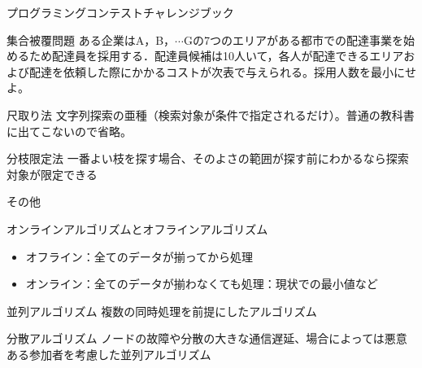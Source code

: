 \documentclass{beamer}
\begin{document}
\begin{frame}[fragile]{プログラミングコンテストチャレンジブック}{}
\begin{block}{集合被覆問題}
ある企業はA，B，$\cdots$Gの7つのエリアがある都市での配達事業を始めるため配達員を採用する．配達員候補は10人いて，各人が配達できるエリアおよび配達を依頼した際にかかるコストが次表で与えられる。採用人数を最小にせよ。
\end{block}

\begin{block}{尺取り法}
文字列探索の亜種（検索対象が条件で指定されるだけ）。普通の教科書に出てこないので省略。
\end{block}

\begin{block}{分枝限定法}
一番よい枝を探す場合、そのよさの範囲が探す前にわかるなら探索対象が限定できる
\end{block}
\end{frame}

\begin{frame}[fragile]{その他}{}

\begin{block}{オンラインアルゴリズムとオフラインアルゴリズム}
\begin{itemize}%
\item オフライン：全てのデータが揃ってから処理
\item オンライン：全てのデータが揃わなくても処理：現状での最小値など
\end{itemize}
\end{block}

\begin{block}{並列アルゴリズム}
複数の同時処理を前提にしたアルゴリズム
\end{block}

\begin{block}{分散アルゴリズム}
ノードの故障や分散の大きな通信遅延、場合によっては悪意ある参加者を考慮した並列アルゴリズム
\end{block}
\end{frame}
\end{document}
